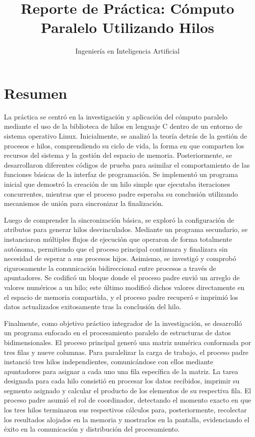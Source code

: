 \documentclass[11pt,a4paper]{article}
\title{Reporte de Práctica: Cómputo Paralelo Utilizando Hilos}
\author{Ingeniería en Inteligencia Artificial}
\date{}
\begin{document}
\maketitle
\section*{Resumen}

La práctica se centró en la investigación y aplicación del cómputo paralelo mediante el uso de la biblioteca de hilos en lenguaje C dentro de un entorno de sistema operativo Linux. Inicialmente, se analizó la teoría detrás de la gestión de procesos e hilos, comprendiendo su ciclo de vida, la forma en que comparten los recursos del sistema y la gestión del espacio de memoria. Posteriormente, se desarrollaron diferentes códigos de prueba para asimilar el comportamiento de las funciones básicas de la interfaz de programación. Se implementó un programa inicial que demostró la creación de un hilo simple que ejecutaba iteraciones concurrentes, mientras que el proceso padre esperaba su conclusión utilizando mecanismos de unión para sincronizar la finalización.

Luego de comprender la sincronización básica, se exploró la configuración de atributos para generar hilos desvinculados. Mediante un programa secundario, se instanciaron múltiples flujos de ejecución que operaron de forma totalmente autónoma, permitiendo que el proceso principal continuara y finalizara sin necesidad de esperar a sus procesos hijos. Asimismo, se investigó y comprobó rigurosamente la comunicación bidireccional entre procesos a través de apuntadores. Se codificó un bloque donde el proceso padre envió un arreglo de valores numéricos a un hilo; este último modificó dichos valores directamente en el espacio de memoria compartida, y el proceso padre recuperó e imprimió los datos actualizados exitosamente tras la conclusión del hilo.

Finalmente, como objetivo práctico integrador de la investigación, se desarrolló un programa enfocado en el procesamiento paralelo de estructuras de datos bidimensionales. El proceso principal generó una matriz numérica conformada por tres filas y nueve columnas. Para paralelizar la carga de trabajo, el proceso padre instanció tres hilos independientes, comunicándose con ellos mediante apuntadores para asignar a cada uno una fila específica de la matriz. La tarea designada para cada hilo consistió en procesar los datos recibidos, imprimir su segmento asignado y calcular el producto de los elementos de su respectiva fila. El proceso padre asumió el rol de coordinador, detectando el momento exacto en que los tres hilos terminaron sus respectivos cálculos para, posteriormente, recolectar los resultados alojados en la memoria y mostrarlos en la pantalla, evidenciando el éxito en la comunicación y distribución del procesamiento.
\clearpage
\end{document}
